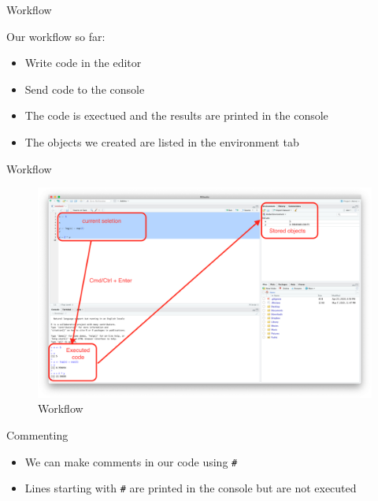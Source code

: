 \documentclass[ignorenonframetext,]{beamer}
\begin{document}
\begin{frame}{Workflow}
\protect\hypertarget{workflow}{}

Our workflow so far:

\begin{itemize}
\item
  Write code in the editor
\item
  Send code to the console
\item
  The code is exectued and the results are printed in the console
\item
  The objects we created are listed in the environment tab
\end{itemize}

\end{frame}

\begin{frame}{Workflow}
\protect\hypertarget{workflow-1}{}

\begin{figure}
\includegraphics[scale=0.18]{figures/wf}
\caption{Workflow}
\end{figure}

\end{frame}

\begin{frame}[fragile]{Commenting}
\protect\hypertarget{commenting}{}

\begin{itemize}
\item
  We can make comments in our code using \texttt{\#}
\item
  Lines starting with \texttt{\#} are printed in the console but are not
  executed
\end{itemize}

\end{frame}
\end{document}
